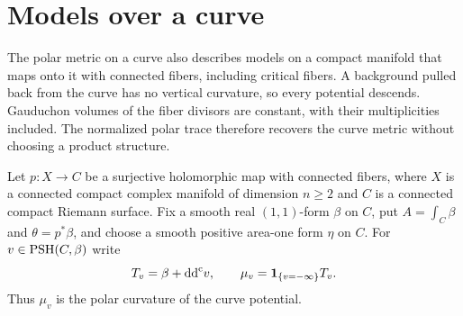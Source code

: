 \section{Models over a curve}
\label{subsec:curve-fibration-polar-models}

The polar metric on a curve also describes models on a compact
manifold that maps onto it with connected fibers, including
critical fibers. A background pulled back from the curve has no
vertical curvature, so every potential descends. Gauduchon
volumes of the fiber divisors are constant, with their
multiplicities included. The normalized polar trace therefore
recovers the curve metric without choosing a product structure.

Let $p\colon X\to C$ be a surjective holomorphic map with connected
fibers, where $X$ is a connected compact complex manifold of
dimension $n\geq2$ and $C$ is a connected compact Riemann surface.
Fix a smooth real $(1,1)$-form $\beta$ on $C$, put
$A=\int_C\beta$ and $\theta=p^*\beta$, and choose a smooth
positive area-one form $\eta$ on $C$. For
$v\in\mathrm{PSH}(C,\beta)$ write
\[
 T_v=\beta+\mathrm{dd}^{\mathrm{c}} v,\qquad
 \mu_v=\mathbf1_{\{v=-\infty\}}T_v.
\]
Thus $\mu_v$ is the polar curvature of the curve potential.

